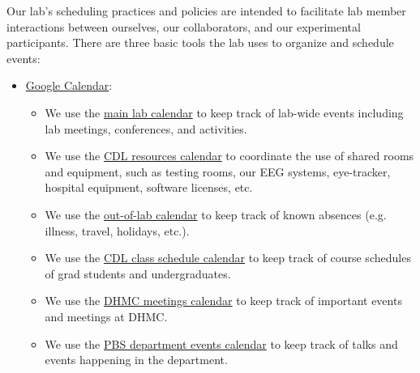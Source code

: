 \documentclass{tufte-book} %
\begin{document}
\label{sec: scheduling}

\noindent{}Our lab's scheduling practices and
policies are intended to facilitate lab member interactions between
ourselves, our collaborators, and our experimental participants.
There are three basic tools the lab uses to organize and schedule
events:
\begin{itemize}
\item \href{http://calendar.google.com}{Google Calendar}:
  \begin{itemize}
  \item We use the
    \href{https://calendar.google.com/calendar/ical/5ta50cfv4uih0a0k8m2di9dhjo\%40group.calendar.google.com/private-ff1338ddce84ac37d5ab682cd94e7f69/basic.ics}{main
      lab calendar} to keep track of lab-wide events including lab
    meetings, conferences, and activities.
      \item We use the
  \href{https://calendar.google.com/calendar/ical/dgcv8l8a8s10hfg2s5h0qec0q0\%40group.calendar.google.com/private-4810aed94f818d5748045447ab46c62d/basic.ics}{CDL
    resources calendar} to coordinate the use of shared rooms and
  equipment, such as testing rooms, our EEG systems, eye-tracker, hospital
  equipment, software licenses, etc.
  \item We use the \href{https://calendar.google.com/calendar/ical/h1j06dohcg7v1g2o5tkb7ijhvs\%40group.calendar.google.com/private-239aaf8b4dc60480c90e8d7fc353e229/basic.ics}{out-of-lab calendar} to keep track of known
  absences (e.g. illness, travel, holidays, etc.).
\item We use the
  \href{https://calendar.google.com/calendar/ical/v2selomg4o6aobua7g922aamqc\%40group.calendar.google.com/private-4377dd542d0d1f6226c9657955b778c5/basic.ics}{CDL
  class schedule calendar} to keep track of course
schedules of grad students and undergraduates.
  \item We use the \href{https://calendar.google.com/calendar/ical/j6noo2tqahpsoq9na1h16paf3s\%40group.calendar.google.com/private-c3d75bea1ab4605947353d159d3dcd05/basic.ics}{DHMC meetings
  calendar} to keep track of important events and meetings at DHMC.
  \item We use the \href{https://calendar.google.com/calendar/ical/mp1bujb39ud5bgmmnq9r8dbiuk\%40group.calendar.google.com/private-8a3c6919c30e7b118ab3a4fd23aad6cf/basic.ics}{PBS department events calendar} to keep track of talks and events happening in the department.

\end{itemize}
\end{itemize}
\end{document}
